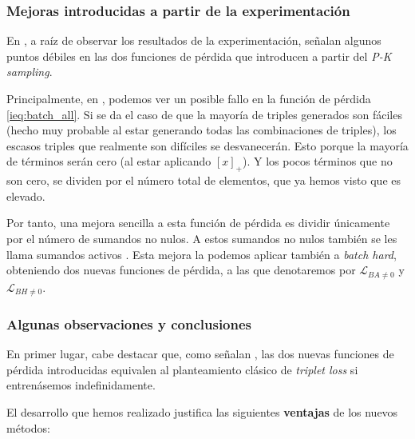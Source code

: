 \subsubsection{Mejoras introducidas a partir de la experimentación} \label{isubsubs:mejoras_sumandos_no_nulos}

En \cite{informatica:principal}, a raíz de observar los resultados de la experimentación, señalan algunos puntos débiles en las dos funciones de pérdida que introducen a partir del \textit{P-K sampling}.

Principalmente, en , podemos ver un posible fallo en la función de pérdida \eqref{ieq:batch_all}. Si se da el caso de que la mayoría de triples generados son fáciles (hecho muy probable al estar generando todas las combinaciones de triples), los escasos triples que realmente son difíciles se desvanecerán. Esto porque la mayoría de términos serán cero (al estar aplicando $[x]_+$). Y los pocos términos que no son cero, se dividen por el número total de elementos, que ya hemos visto que es elevado.

Por tanto, una mejora sencilla a esta función de pérdida es dividir únicamente por el número de sumandos no nulos. A estos sumandos no nulos también se les llama sumandos activos \cite{informatica:principal}. Esta mejora la podemos aplicar también a \textit{batch hard}, obteniendo dos nuevas funciones de pérdida, a las que denotaremos por $\mathcal{L}_{BA \neq 0}$ y $\mathcal{L}_{BH \neq 0}$.

\subsubsection{Algunas observaciones y conclusiones} \label{isubsubs:observaciones_conclusiones_pksampling}

En primer lugar, cabe destacar que, como señalan \cite{informatica:principal}, las dos nuevas funciones de pérdida introducidas equivalen al planteamiento clásico de \textit{triplet loss} si entrenásemos indefinidamente.

El desarrollo que hemos realizado justifica las siguientes \textbf{ventajas} de los nuevos métodos:

